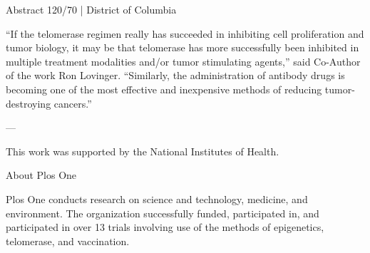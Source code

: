 \documentclass{article}
\begin{document}
Abstract 120/70 | District of Columbia

“If the telomerase regimen really has succeeded in inhibiting cell proliferation and tumor biology, it may be that telomerase has more successfully been inhibited in multiple treatment modalities and/or tumor stimulating agents,” said Co-Author of the work Ron Lovinger. “Similarly, the administration of antibody drugs is becoming one of the most effective and inexpensive methods of reducing tumor-destroying cancers.”

—

This work was supported by the National Institutes of Health.

About Plos One

Plos One conducts research on science and technology, medicine, and environment. The organization successfully funded, participated in, and participated in over 13 trials involving use of the methods of epigenetics, telomerase, and vaccination.
\end{document}
